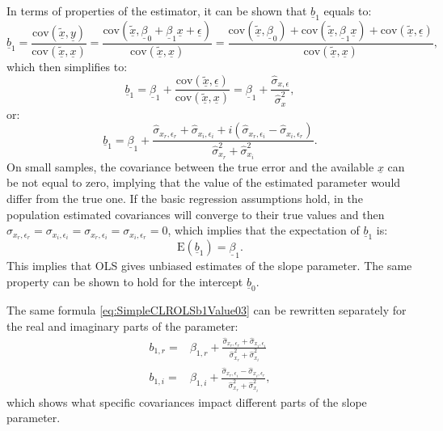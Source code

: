 \documentclass[
]{book}
\begin{document}
In terms of properties of the estimator, it can be shown that \(\underline{b}_1\) equals to:
\begin{equation}
        \underline{b}_1 = \frac{\mathrm{cov}(\underline{\tilde{x}}, \underline{y})}{\mathrm{cov}(\underline{\tilde{x}},\underline{x})} = \frac{\mathrm{cov}(\underline{\tilde{x}}, \underline{\beta}_0 + \underline{\beta}_1 \underline{x} + \underline{\epsilon})}{\mathrm{cov}(\underline{\tilde{x}},\underline{x})} = \frac{\mathrm{cov}(\underline{\tilde{x}}, \underline{\beta}_0) + \mathrm{cov}(\underline{\tilde{x}}, \underline{\beta}_1 \underline{x}) + \mathrm{cov}(\underline{\tilde{x}}, \underline{\epsilon})}{\mathrm{cov}(\underline{\tilde{x}},\underline{x})},
    \label{eq:SimpleCLROLSb1Value01}
\end{equation}
which then simplifies to:
\begin{equation}
        \underline{b}_1 = \underline{\beta}_1 + \frac{\mathrm{cov}(\underline{\tilde{x}}, \underline{\epsilon})}{\mathrm{cov}(\underline{\tilde{x}},\underline{x})} = \underline{\beta}_1 + \frac{\hat{\sigma}_{x,\epsilon}}{\hat{\sigma}_x^2} ,
    \label{eq:SimpleCLROLSb1Value02}
\end{equation}
or:
\begin{equation}
        \underline{b}_1 = \underline{\beta}_1 + \frac{\hat{\sigma}_{x_r, \epsilon_r} + \hat{\sigma}_{x_i, \epsilon_i} + i (\hat{\sigma}_{x_r, \epsilon_i} - \hat{\sigma}_{x_i, \epsilon_r})}{\hat{\sigma}_{x_r}^2 + \hat{\sigma}_{x_i}^2} .
    \label{eq:SimpleCLROLSb1Value03}
\end{equation}
On small samples, the covariance between the true error and the available \(\underline{x}\) can be not equal to zero, implying that the value of the estimated parameter would differ from the true one. If the basic regression assumptions hold, in the population estimated covariances will converge to their true values and then \({\sigma}_{x_r, \epsilon_r} = {\sigma}_{x_i, \epsilon_i} = {\sigma}_{x_r, \epsilon_i} = {\sigma}_{x_i, \epsilon_r}=0\), which implies that the expectation of \(\underline{b}_1\) is:
\begin{equation}
        \mathrm{E}(\underline{b}_1) = \underline{\beta}_1 .
    \label{eq:SimpleCLROLSb1Expectation}
\end{equation}
This implies that OLS gives unbiased estimates of the slope parameter. The same property can be shown to hold for the intercept \(\underline{b}_0\).

The same formula \eqref{eq:SimpleCLROLSb1Value03} can be rewritten separately for the real and imaginary parts of the parameter:
\begin{equation}
    \begin{aligned}
        b_{1,r} = & \beta_{1,r} + \frac{\hat{\sigma}_{x_r, \epsilon_r} + \hat{\sigma}_{x_i, \epsilon_i}}{\hat{\sigma}_{x_r}^2 + \hat{\sigma}_{x_i}^2} \\
        b_{1,i} = & \beta_{1,i} + \frac{\hat{\sigma}_{x_r, \epsilon_i} - \hat{\sigma}_{x_i, \epsilon_r}}{\hat{\sigma}_{x_r}^2 + \hat{\sigma}_{x_i}^2} ,
    \end{aligned}
    \label{eq:SimpleCLROLSb1Value04}
\end{equation}
which shows what specific covariances impact different parts of the slope parameter.
\end{document}
